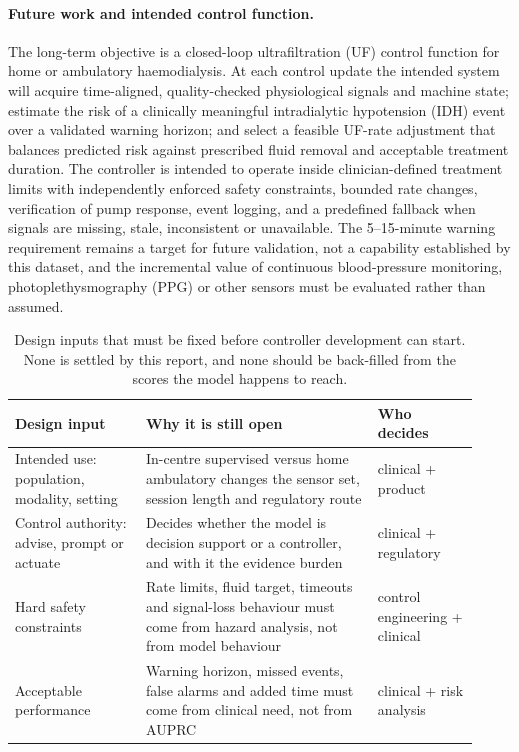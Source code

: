 \documentclass{article}
\begin{document}
\paragraph{Future work and intended control function.} The long-term objective is a closed-loop ultrafiltration (UF) control
function for home or ambulatory haemodialysis. At each control update the intended system will acquire time-aligned,
quality-checked physiological signals and machine state; estimate the risk of a clinically meaningful intradialytic hypotension
(IDH) event over a validated warning horizon; and select a feasible UF-rate adjustment that balances predicted risk against
prescribed fluid removal and acceptable treatment duration. The controller is intended to operate inside clinician-defined
treatment limits with independently enforced safety constraints, bounded rate changes, verification of pump response, event
logging, and a predefined fallback when signals are missing, stale, inconsistent or unavailable. The 5--15-minute warning
requirement remains a target for future validation, not a capability established by this dataset, and the incremental value
of continuous blood-pressure monitoring, photoplethysmography (PPG) or other sensors must be evaluated rather than assumed.

\begin{table}[t]
\caption{Design inputs that must be fixed before controller development can start. None is settled by this report, and none
should be back-filled from the scores the model happens to reach.}
\label{tab:design}
\centering
\small
\begin{tabular}{>{\raggedright\arraybackslash}p{0.26\linewidth}>{\raggedright\arraybackslash}p{0.46\linewidth}>{\raggedright\arraybackslash}p{0.20\linewidth}}
\toprule
Design input & Why it is still open & Who decides \\
\midrule
Intended use: population, modality, setting & In-centre supervised versus home ambulatory changes the sensor set, session length and regulatory route & clinical + product \\[3pt]
Control authority: advise, prompt or actuate & Decides whether the model is decision support or a controller, and with it the evidence burden & clinical + regulatory \\[3pt]
Hard safety constraints & Rate limits, fluid target, timeouts and signal-loss behaviour must come from hazard analysis, not from model behaviour & control engineering + clinical \\[3pt]
Acceptable performance & Warning horizon, missed events, false alarms and added time must come from clinical need, not from AUPRC & clinical + risk analysis \\
\bottomrule
\end{tabular}
\end{table}
\end{document}
